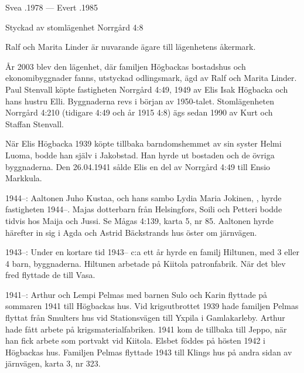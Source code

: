 Svea .1978  ---  Evert .1985



%

Styckad av stomlägenhet Norrgård 4:8

%
Ralf och Marita Linder är nuvarande ägare till lägenhetens åkermark.\jhvspace{}


%
År 2003 blev den lägenhet, där familjen Högbackas bostadshus och ekonomibyggnader fanns, utstyckad odlingsmark, ägd av Ralf och Marita Linder. Paul Stenvall köpte fastigheten Norrgård 4:49, 1949 av Elis Isak Högbacka och hans hustru Elli. Byggnaderna revs i början av 1950-talet. Stomlägenheten Norrgård 4:210 (tidigare 4:49 och år 1915 4:8) ägs sedan 1990 av Kurt och Staffan Stenvall.


%
När Elis Högbacka 1939 köpte tillbaka barndomshemmet av sin syster Helmi Luoma, bodde han själv i Jakobstad. Han hyrde ut bostaden och de övriga byggnaderna. Den 26.04.1941 sålde Elis en del av Norrgård 4:49 till Ensio Markkula.


1944--:
Aaltonen Juho Kustaa,  och hans sambo Lydia Maria Jokinen, , hyrde fastigheten 1944--. Majas dotterbarn från Helsingfors, Soili och Petteri bodde tidvis hos Maija och Jussi. Se Mågas 4:139, karta 5, nr 85. Aaltonen hyrde härefter in sig i Agda och Astrid Bäckstrands hus öster om järnvägen.

1943--:
Under en kortare tid 1943-- c:a ett år hyrde en familj Hiltunen, med 3 eller 4 barn, byggnaderna. Hiltunen arbetade på Kiitola patronfabrik. När det blev fred flyttade de till Vasa.

1941--:
Arthur och Lempi Pelmas med barnen Sulo och Karin	flyttade på sommaren 1941 till Högbackas hus. Vid krigsutbrottet 1939 hade familjen Pelmas flyttat från Smulters hus vid Stationsvägen till Yxpila i Gamlakarleby. Arthur hade fått arbete på krigsmaterialfabriken. 1941 kom de tillbaka till Jeppo, när han fick arbete som portvakt vid Kiitola. Elsbet föddes på hösten 1942 i Högbackas hus. Familjen Pelmas flyttade 1943 till Klings hus på andra sidan av järnvägen, karta 3, nr 323.


